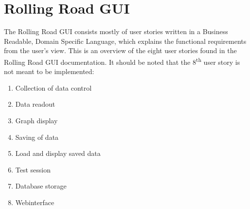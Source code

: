\newpage
\section{Rolling Road GUI}
The Rolling Road GUI consists mostly of user stories written in a Business Readable, Domain Specific Language, which explains the functional requirements from the user's view.
This is an overview of the eight user stories found in the Rolling Road GUI documentation\cite{GUI}. It should be noted that the 8\textsuperscript{th} user story is not meant to be implemented:

\begin{enumerate}[US1:]
	\item Collection of data control
	\item Data readout
	\item Graph display
	\item Saving of data
	\item Load and display saved data
	\item Test session
	\item Database storage
	\item Webinterface
\end{enumerate}